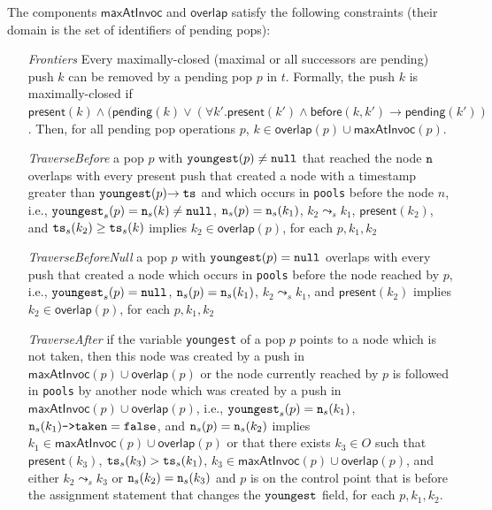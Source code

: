 The components $\mathsf{maxAtInvoc}$ and $\mathsf{overlap}$ satisfy the following constraints (their domain is the set of identifiers of pending pops):
\vspace{-2mm}
\begin{itemize}
    \item[\emph{Frontiers}] Every maximally-closed (maximal or all successors are pending) push $k$ can be removed by a pending pop $p$ in $t$. Formally, the push $k$ is maximally-closed if $\mathsf{present}(k) \land (\mathsf{pending}(k) \lor (\forall k'. \mathsf{present}(k') \land \mathsf{before}(k,k') \rightarrow \mathsf{pending}(k'))$. Then, for all pending pop operations $p$, $k \in \mathsf{overlap}(p) \cup \mathsf{maxAtInvoc}(p)$.
	\item[\emph{TraverseBefore}] a pop $p$ with ${\tt youngest}(p)\neq {\tt null}$ that reached the node ${\tt n}$ overlaps with every present push that created a node with a timestamp greater than ${\tt youngest}(p){\tt ->ts}$ and which occurs in  {\tt pools} before the node $n$, i.e., ${\tt youngest}_s(p)= {\tt n}_s(k) \neq{\tt null}$, ${\tt n}_s(p)={\tt n}_s(k_1)$, $k_2\leadsto_s k_1$, $\mathsf{present}(k_2)$, and ${\tt ts}_s(k_2) \geq {\tt ts}_s(k)$ implies $k_2\in \mathsf{overlap}(p)$, for each $p, k_1, k_2$
	\item[\emph{TraverseBeforeNull}] a pop $p$ with ${\tt youngest}(p)={\tt null}$ overlaps with every push that created a node which occurs in {\tt pools} before the node reached by $p$,
i.e., ${\tt youngest}_s(p)={\tt null}$, ${\tt n}_s(p)={\tt n}_s(k_1)$, $k_2\leadsto_s k_1$, and $\mathsf{present}(k_2)$ implies $k_2\in \mathsf{overlap}(p)$, for each $p, k_1, k_2$
	\item[\emph{TraverseAfter}] if the variable {\tt youngest} of a pop $p$ points to a node which is not taken, then this node was created by a push in $\mathsf{maxAtInvoc}(p)\cup \mathsf{overlap}(p)$ or the node currently reached by $p$ is followed in {\tt pools} by another node which was created by a push in $\mathsf{maxAtInvoc}(p)\cup \mathsf{overlap}(p)$, i.e., ${\tt youngest}_s(p)={\tt n}_s(k_1)$, ${\tt n}_s(k_1)\text{{\tt ->taken}}={\tt false}$, and ${\tt n}_s(p)={\tt n}_s(k_2)$ implies $k_1\in \mathsf{maxAtInvoc}(p)\cup \mathsf{overlap}(p)$ or that there exists $k_3\in O$ such that $\mathsf{present}(k_3)$, ${\tt ts}_s(k_3) > {\tt ts}_s(k_1)$, $k_3\in \mathsf{maxAtInvoc}(p)\cup \mathsf{overlap}(p)$, and either $k_2\leadsto_s k_3$ or ${\tt n}_s(k_2)={\tt n}_s(k_3)$ and $p$ is on the control point that is before the assignment statement that changes the ${\tt youngest}$ field, for each $p, k_1,k_2$.

\end{itemize}
